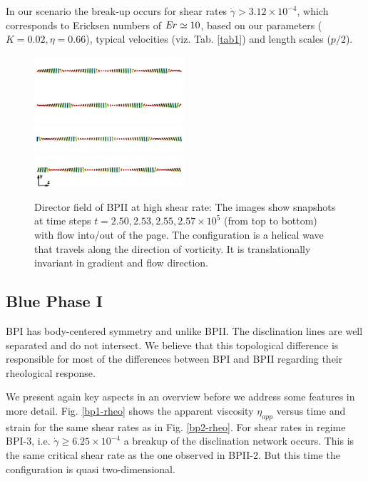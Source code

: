 \documentclass[aps,pre,reprint,superscriptaddress, twocolumn]{revtex4}
\newcommand{\e}[1]{\times10^{#1}}
\newcommand{\gd}{\dot{\gamma}}
\begin{document}
In our scenario the break-up occurs for shear rates $\gd>3.12\e{-4}$, which
corresponds to Ericksen numbers of ${\it Er}\simeq10$, based on our
parameters ($K=0.02, \eta=0.66$), typical velocities (viz. Tab. \ref{tab1}) 
and length scales ($p/2$).

\begin{figure}[htpb]
\includegraphics[width=0.495\textwidth]{dir+y-250k_run949.png}
\includegraphics[width=0.495\textwidth]{dir+y-253k_run949.png}
\includegraphics[width=0.495\textwidth]{dir+y-255k_run949.png}
\includegraphics[width=0.495\textwidth]{dir+y-257k_run949.png}
\caption{Director field of BPII at high shear rate: The images show snapshots at time steps 
$t=2.50, 2.53,2.55, 2.57\e{5}$ (from top to bottom) with flow into/out of the page. 
The configuration is a helical wave that travels along the direction of vorticity.
It is translationally invariant in gradient and flow direction.}
\label{bp2-high}
\end{figure}

\subsection{Blue Phase I}

BPI has body-centered symmetry and unlike BPII. The disclination lines
 are well separated and do not intersect.
We believe that this topological difference is responsible for most of
the differences between BPI and BPII regarding their rheological response. 

We present again key aspects in an overview before we 
address some features in more detail. Fig. \ref{bp1-rheo} shows the 
apparent viscosity $\eta_{app}$ versus time and strain for the same shear rates
as in Fig. \ref{bp2-rheo}.
For shear rates in regime BPI-3, i.e. $\gd\ge6.25\e{-4}$ a breakup of 
the disclination network occurs. This is the same critical shear rate as 
the one observed in BPII-2. But this time the configuration is quasi 
two-dimensional.
\end{document}
